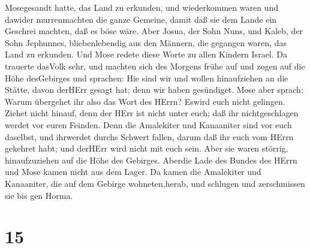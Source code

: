 Mosegesandt hatte, das Land zu erkunden, und wiederkommen waren und
dawider murrenmachten die ganze Gemeine,  damit daß sie dem
Lande ein Geschrei machten, daß es böse wäre.  Aber Josua,
der Sohn Nuns, und Kaleb, der Sohn Jephunnes, bliebenlebendig aus den
Männern, die gegangen waren, das Land zu erkunden.  Und
Mose redete diese Worte zu allen Kindern Israel. Da trauerte dasVolk
sehr,  und machten sich des Morgens frühe auf und zogen auf
die Höhe desGebirges und sprachen: Hie sind wir und wollen hinaufziehen
an die Stätte, davon derHErr gesagt hat; denn wir haben gesündiget.
 Mose aber sprach: Warum übergehet ihr also das Wort des
HErrn? Eswird euch nicht gelingen.  Ziehet nicht hinauf,
denn der HErr ist nicht unter euch; daß ihr nichtgeschlagen werdet vor
euren Feinden.  Denn die Amalekiter und Kanaaniter sind vor
euch daselbst, und ihrwerdet durchs Schwert fallen, darum daß ihr euch
vom HErrn gekehret habt; und derHErr wird nicht mit euch sein.
 Aber sie waren störrig, hinaufzuziehen auf die Höhe des
Gebirges. Aberdie Lade des Bundes des HErrn und Mose kamen nicht aus dem
Lager.  Da kamen die Amalekiter und Kanaaniter, die auf dem
Gebirge wohneten,herab, und schlugen und zerschmissen sie bis gen Horma.

\hypertarget{section-14}{%
\section{15}\label{section-14}}

